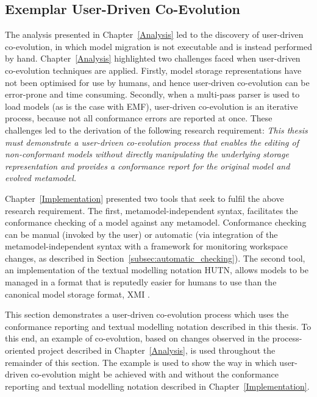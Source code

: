 
\subsection{Exemplar User-Driven Co-Evolution}
The analysis presented in Chapter~\ref{Analysis} led to the discovery of user-driven co-evolution, in which model migration is not executable and is instead performed by hand. Chapter~\ref{Analysis} highlighted two challenges faced when user-driven co-evolution techniques are applied. Firstly, model storage representations have not been optimised for use by humans, and hence user-driven co-evolution can be error-prone and time consuming. Secondly, when a multi-pass parser is used to load models (as is the case with EMF), user-driven co-evolution is an iterative process, because not all conformance errors are reported at once. These challenges led to the derivation of the following research requirement: \emph{This thesis must demonstrate a user-driven co-evolution process that enables the editing of non-conformant models without directly manipulating the underlying storage representation and provides a conformance report for the original model and evolved metamodel.}

Chapter~\ref{Implementation} presented two tools that seek to fulfil the above research requirement. The first, metamodel-independent syntax, facilitates the conformance checking of a model against any metamodel. Conformance checking can be manual (invoked by the user) or automatic (via integration of the metamodel-independent syntax with a framework for monitoring workspace changes, as described in Section~\ref{subsec:automatic_checking}). The second tool, an implementation of the textual modelling notation HUTN, allows models to be managed in a format that is reputedly easier for humans to use than the canonical model storage format, XMI \cite{hutn}.

This section demonstrates a user-driven co-evolution process which uses the conformance reporting and textual modelling notation described in this thesis. To this end, an example of co-evolution, based on changes observed in the process-oriented project described in Chapter~\ref{Analysis}, is used throughout the remainder of this section. The example is used to show the way in which user-driven co-evolution might be achieved with and without the conformance reporting and textual modelling notation described in Chapter~\ref{Implementation}.

